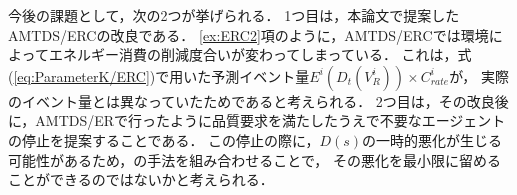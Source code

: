 \documentclass[12pt,a4j,twoside]{jarticle}
\begin{document}
  今後の課題として，次の2つが挙げられる．
  1つ目は，本論文で提案したAMTDS/ERCの改良である．
  \ref{ex:ERC2}項のように，AMTDS/ERCでは環境によってエネルギー消費の削減度合いが変わってしまっている．
  これは，式(\ref{eq:ParameterK/ERC})で用いた予測イベント量$E^i(D_t(V^i_R)) \times C^i_{rate}$が，
  実際のイベント量とは異なっていたためであると考えられる．
  2つ目は，その改良後に，AMTDS/ERで行ったように品質要求を満たしたうえで不要なエージェントの停止を提案することである．
  この停止の際に，$D(s)$の一時的悪化が生じる可能性があるため，\cite{Tsuiki2022}の手法を組み合わせることで，
  その悪化を最小限に留めることができるのではないかと考えられる．
  

  \clearpage
  
  
\end{document}
